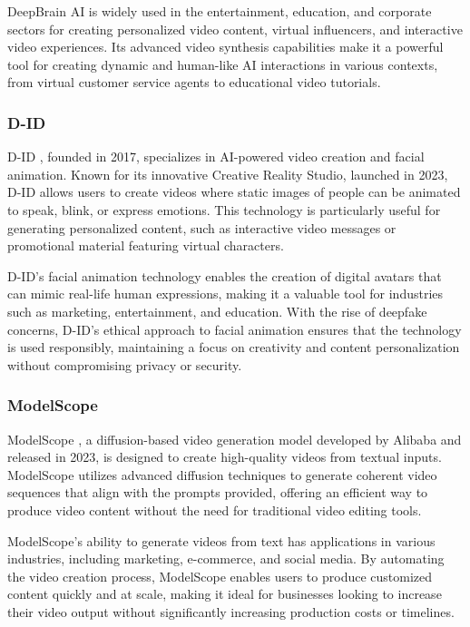 DeepBrain AI is widely used in the entertainment, education, and corporate sectors for creating personalized video content, virtual influencers, and interactive video experiences. 
Its advanced video synthesis capabilities make it a powerful tool for creating dynamic and human-like AI interactions in various contexts, from virtual customer service agents to educational video tutorials.

\subsubsection{D-ID}

D-ID \cite{garon2023practical}, founded in 2017, specializes in AI-powered video creation and facial animation. 
Known for its innovative Creative Reality Studio, launched in 2023, D-ID allows users to create videos where static images of people can be animated to speak, blink, or express emotions. 
This technology is particularly useful for generating personalized content, such as interactive video messages or promotional material featuring virtual characters.

D-ID's facial animation technology enables the creation of digital avatars that can mimic real-life human expressions, making it a valuable tool for industries such as marketing, entertainment, and education. 
With the rise of deepfake concerns, D-ID's ethical approach to facial animation ensures that the technology is used responsibly, maintaining a focus on creativity and content personalization without compromising privacy or security.

\subsubsection{ModelScope}

ModelScope \cite{wang2023modelscope}, a diffusion-based video generation model developed by Alibaba and released in 2023, is designed to create high-quality videos from textual inputs. 
ModelScope utilizes advanced diffusion techniques to generate coherent video sequences that align with the prompts provided, offering an efficient way to produce video content without the need for traditional video editing tools.

ModelScope's ability to generate videos from text has applications in various industries, including marketing, e-commerce, and social media. 
By automating the video creation process, ModelScope enables users to produce customized content quickly and at scale, making it ideal for businesses looking to increase their video output without significantly increasing production costs or timelines.

